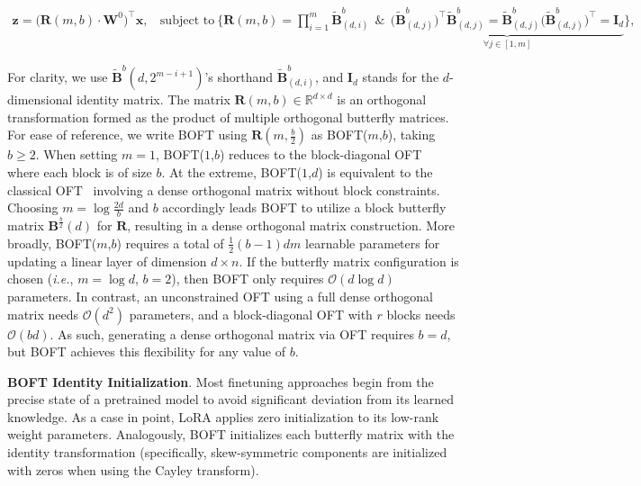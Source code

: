 \begin{equation}
    \begin{aligned}\nonumber
    \bm{z} = \big(\bm{R}(m,b)\cdot\bm{W}^0\big)^\top \bm{x},~~~~\text{subject to}~\bigg\{\bm{R}(m,b) = \prod_{i=1}^m \tilde{\bm{B}}^b_{(d,i)}~~\&~~\underbrace{\big(\tilde{\bm{B}}^b_{(d,j)}\big)^\top\tilde{\bm{B}}^b_{(d,j)} = \tilde{\bm{B}}^b_{(d,j)}\big(\tilde{\bm{B}}^b_{(d,j)}\big)^\top = \bm{I}_d}_{\forall j \in [1, m]}\bigg\},
    \end{aligned}
\end{equation}

For clarity, we use $\tilde{\bm{B}}^b(d,2^{m-i+1})$'s shorthand $\tilde{\bm{B}}^b_{(d,i)}$, and $\bm{I}_d$ stands for the $d$-dimensional identity matrix. The matrix $\bm{R}(m,b)\in\mathbb{R}^{d\times d}$ is an orthogonal transformation formed as the product of multiple orthogonal butterfly matrices. For ease of reference, we write BOFT using $\bm{R}(m,\frac{b}{2})$ as BOFT($m$,$b$), taking $b \geq 2$. When setting $m=1$, BOFT($1$,$b$) reduces to the block-diagonal OFT~\cite{qiu2023controlling} where each block is of size $b$. At the extreme, BOFT($1$,$d$) is equivalent to the classical OFT~\cite{qiu2023controlling} involving a dense orthogonal matrix without block constraints. Choosing $m=\log \frac{2d}{b}$ and $b$ accordingly leads BOFT to utilize a block butterfly matrix $\bm{B}^{\frac{b}{2}}(d)$ for $\bm{R}$, resulting in a dense orthogonal matrix construction. More broadly, BOFT($m$,$b$) requires a total of $\frac{1}{2}(b-1)dm$ learnable parameters for updating a linear layer of dimension $d\times n$. If the butterfly matrix configuration is chosen (\emph{i.e.}, $m = \log d$, $b = 2$), then BOFT only requires $\mathcal{O}(d\log d)$ parameters. In contrast, an unconstrained OFT using a full dense orthogonal matrix needs $\mathcal{O}(d^2)$ parameters, and a block-diagonal OFT with $r$ blocks needs $\mathcal{O}(bd)$. As such, generating a dense orthogonal matrix via OFT requires $b=d$, but BOFT achieves this flexibility for any value of $b$.

\textbf{BOFT Identity Initialization}. Most finetuning approaches begin from the precise state of a pretrained model to avoid significant deviation from its learned knowledge. As a case in point, LoRA applies zero initialization to its low-rank weight parameters. Analogously, BOFT initializes each butterfly matrix with the identity transformation (specifically, skew-symmetric components are initialized with zeros when using the Cayley transform).

